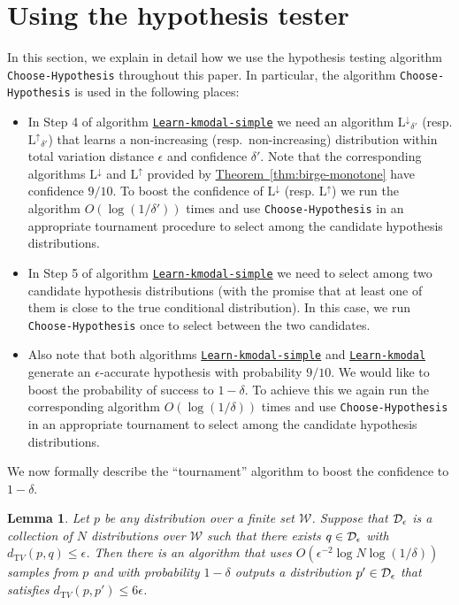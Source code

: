 \documentclass[10pt]{article}
\newtheorem{lemma}[theorem]{Lemma}
\theoremstyle{definition}
\numberwithin{equation}{section}
\newcommand{\expref}[2]{\texorpdfstring{\hyperref[#2]{#1~\ref{#2}}}{#1~\ref{#2}}}
\newcommand{\algorithml}[1]{{\normalfont\texttt{#1}}}
\newcommand{\dtv}{d_{\mathrm TV}}
\newcommand{\eps}{\epsilon}
\newcommand{\AND}{{\mathrm{L^{\uparrow}}}}
\newcommand{\ANI}{{\mathrm{L^{\downarrow}}}}
\begin{document}
\section{Using the hypothesis tester} \label{sec:ht}

In this section, we explain in detail how we use
the hypothesis testing algorithm \algorithml{Choose-Hypothesis}
throughout this paper. In particular, the algorithm
\algorithml{Choose-Hypothesis} is used in the following places:
\begin{itemize}

\item In Step 4 of algorithm \hyperref[alg:learn-kmodal-simple]{\algorithml{Learn-kmodal-simple}} we need
an algorithm $\ANI_{\delta'}$ (resp. $\AND_{\delta'}$) that learns
a non-increasing (resp.\ non-increasing) distribution within total variation distance
$\eps$ and confidence $\delta'$. Note that the corresponding algorithms
$\ANI$ and $\AND$ provided by \expref{Theorem}{thm:birge-monotone} have confidence $9/10$.
To boost the confidence of $\ANI$ (resp. $\AND$)
we run the algorithm $O(\log(1/\delta'))$ times and use \algorithml{Choose-{\allowbreak}Hypothesis}
in an appropriate tournament procedure to select among the candidate hypothesis distributions.

\item In Step 5 of algorithm \hyperref[alg:learn-kmodal-simple]{\algorithml{Learn-kmodal-simple}} we need to
select among two candidate hypothesis distributions (with the
promise that at least one of them is close to the true
conditional distribution). In this case, we run \algorithml{Choose-Hypothesis} once to select between
the two candidates.

\item Also note that both algorithms \hyperref[alg:learn-kmodal-simple]{\algorithml{Learn-kmodal-simple}} and \hyperref[alg:learn-kmodal]{\algorithml{Learn-kmodal}} generate
an $\eps$-accurate hypothesis with probability $9/10$. We would like to boost the probability
of success to $1-\delta$. To achieve this we again run the corresponding algorithm $O(\log(1/\delta))$
times and use \algorithml{Choose-{\allowbreak}Hypothesis} in an appropriate tournament
to select among the candidate hypothesis distributions.
\end{itemize}

We now formally describe the ``tournament'' algorithm to boost the confidence to $1-\delta$.

\begin{lemma} \label{lem:log-cover-size}
Let $p$ be any distribution over a finite set $\mathcal{W}$.
Suppose that ${\cal D}_\eps$ is a collection of $N$ distributions over $\mathcal{W}$ such that
there exists $q \in {\cal D}_\eps$ with $\dtv(p,q) \leq \eps$.
Then there is an algorithm that uses $O(\eps^{-2}\log N \log(1/\delta))$ samples from
$p$ and with probability $1-\delta$ outputs a distribution $p' \in {\cal D}_{\eps}$ that satisfies
$\dtv(p,p') \leq 6\eps$.
\end{lemma}
\end{document}
